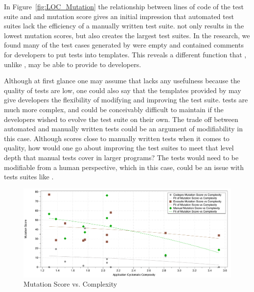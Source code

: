 In Figure~\ref{fig:LOC_Mutation} the relationship between lines of code of the test suite and and mutation score gives an initial impression that automated test suites lack the efficiency of a manually written test suite. \codepro not only results in the lowest mutation scores, but also creates the largest test suites. In the research, we found many of the test cases generated by \codepro were empty and contained comments for developers to put tests into templates. This reveals a different function that \codepro, unlike \evo, may be able to provide to developers. 

Although at first glance one may assume that \codepro lacks any usefulness because the quality of tests are low, one could also say that the templates provided by \codepro may give developers the flexibility of modifying and improving the test suite. \evo tests are much more complex, and could be conceivably difficult to maintain if the developers wished to evolve the test suite on their own. The trade off between automated and manually written tests could be an argument of modifiability in this case. Although \evo scores close to manually written tests when it comes to quality, how would one go about improving the test suites to meet that level depth that manual tests cover in larger programs? The tests would need to be modifiable from a human perspective, which in this case, could be an issue with tests suites like \evo.

\begin{figure}[!t]
\centering
  \includegraphics[width=\textwidth]{Complexity_Mutation}
    \caption{Mutation Score vs. Complexity}
  \label{fig:Complexity_Mutation}
\end{figure}


